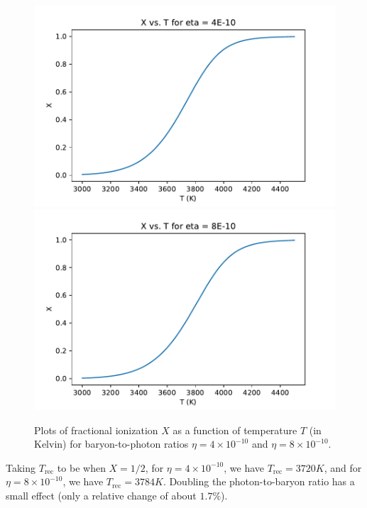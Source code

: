 \begin{figure}[htbp]
    \centering
    \includegraphics[scale=0.52]{Images/Q8-1eta4.pdf}
    \includegraphics[scale=0.52]{Images/Q8-1eta8.pdf}
    
    \caption{Plots of fractional ionization $X$ as a function of temperature $T$ (in Kelvin) for baryon-to-photon ratios $\eta = 4 \times 10^{-10}$ and $\eta = 8 \times 10^{-10}$.}
    \label{fig-Q81}
\end{figure}

Taking $T_{\text{rec}}$ to be when $X = 1/2$, for $\eta = 4 \times 10^{-10}$, we have $\boxed{T_{\text{rec}} = 3720\si{K}}$, and for $\eta = 8 \times 10^{-10}$, we have $\boxed{T_{\text{rec}} = 3784\si{K}}$. Doubling the photon-to-baryon ratio has a small effect (only a relative change of about $1.7\%$).

\subsection{}
\subsection{}
\subsection{}